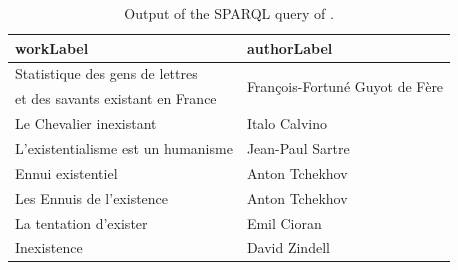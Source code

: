 \begin{table}
	\centering
	{
		\footnotesize%
		\begin{tabular}{ll}
			\toprule
			workLabel & authorLabel \\ \midrule 
			Statistique des gens de lettres 
				& \multirow{2}{*}{François-Fortuné Guyot de Fère}\\
			et des savants existant en France
				& \\
			Le Chevalier inexistant
				& Italo Calvino\\
			L'existentialisme est un humanisme
				& Jean-Paul Sartre\\
			Ennui existentiel
				& Anton Tchekhov\\
			Les Ennuis de l'existence
				& Anton Tchekhov\\
			La tentation d'exister
				& Emil Cioran\\
			Inexistence
				& David Zindell \\ \bottomrule
		\end{tabular}
	}
	\caption{
		\AP\label{tab:output-sparql}
		Output of the SPARQL query of .}
\end{table}

